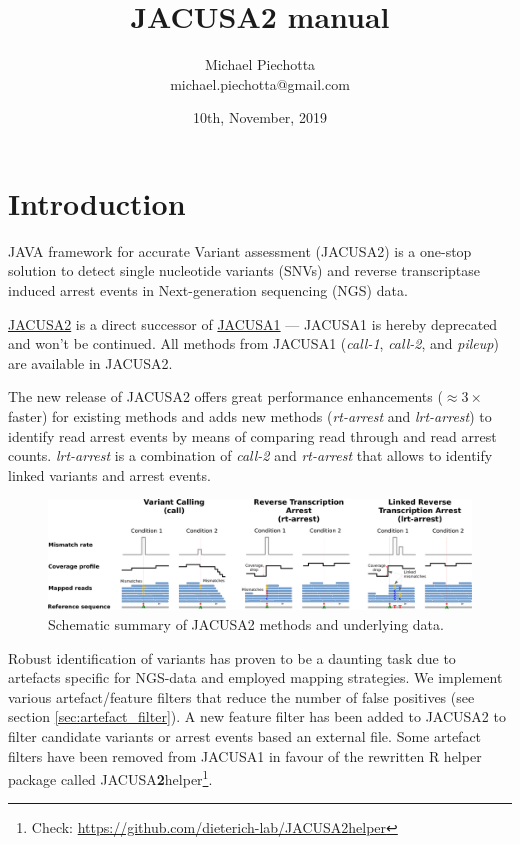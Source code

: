 \documentclass[10pt,a4paper,final]{article}
\title{JACUSA2 manual}
\author{Michael Piechotta \\ michael.piechotta@gmail.com}
\date{10th, November, 2019}
\begin{document}
\newcommand{\call}[1]{\textit{call-#1}\xspace}
\newcommand{\pileup}{\textit{pileup}\xspace}
\newcommand{\rtarrest}{\textit{rt-arrest}\xspace}
\newcommand{\lrtarrest}{\textit{lrt-arrest}\xspace}
\maketitle
\tableofcontents
\listoftodos
\newpage
\section{Introduction}
JAVA framework for accurate Variant assessment (JACUSA2) is a one-stop solution to detect single
nucleotide variants (SNVs) and reverse transcriptase induced arrest events in Next-generation
sequencing (NGS) data.

\href{https://github.com/dieterich-lab/JACUSA2/}{JACUSA2} is a direct successor of 
\href{https://github.com/dieterich-lab/JACUSA/}{JACUSA1} --- JACUSA1 is hereby deprecated and won't be 
continued. All methods from JACUSA1 (\call{1}, \call{2}, and \pileup) are available in JACUSA2.

The new release of JACUSA2 offers great performance enhancements ($\approx3\times$ faster) for existing methods
and adds new methods (\rtarrest and \lrtarrest) to identify read arrest events by means of comparing 
read through and read arrest counts. \lrtarrest is a combination of \call{2} and \rtarrest that 
allows to identify linked variants and arrest events.

\begin{figure}[ht]
  \centering
  \includegraphics[width=\textwidth]{figures/jacusa_methods_cropped}
  \caption{Schematic summary of JACUSA2 methods and underlying data.}
  \label{fig:methods}
\end{figure}

Robust identification of variants has proven to be a daunting task due to artefacts specific for
NGS-data and employed mapping strategies. We implement various artefact/feature filters that reduce
the number of false positives (see section \ref{sec:artefact_filter}). A new feature filter has been
added to JACUSA2 to filter candidate variants or arrest events based an external file.
Some artefact filters have been removed from JACUSA1 in favour of the rewritten R helper package called 
JACUSA\textbf{2}helper\footnote{Check: \url{https://github.com/dieterich-lab/JACUSA2helper}}.
\end{document}

